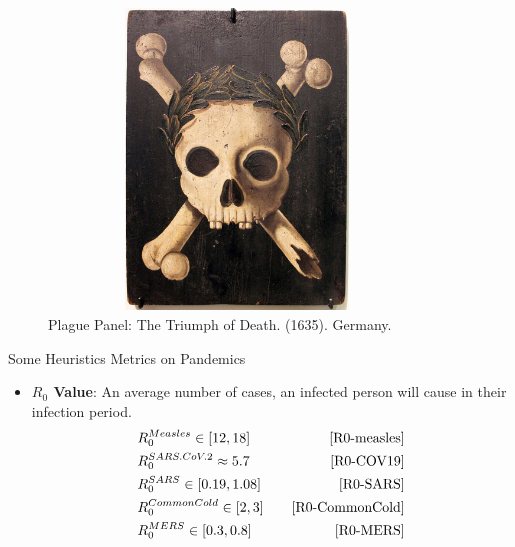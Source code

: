 \documentclass{beamer}
\begin{document}
	\begin{frame}
		\begin{figure}
			\includegraphics[width = 100mm, height = 80mm]{images/german-plague-panel.jpg}
			\caption{Plague Panel: The Triumph of Death. (1635). Germany.}
		\end{figure}
	\end{frame}

    \begin{frame}{Some Heuristics Metrics on Pandemics}
    	\begin{itemize}
    		\item \textbf{$R_0$ Value}: An average number of cases, an infected person will cause in their infection period.\\
    			\begin{align*}
		    		&R^{Measles}_{0} \in [12,18] \quad&\cite{R0-measles}\\
		    		&R^{SARS. CoV. 2}_{0} \approx 5.7\quad&\cite{R0-COV19}\\
		    		&R^{SARS}_{0} \in  [0.19,1.08]\quad&\cite{R0-SARS}\\
		    		&R^{Common Cold}_{0} \in [2,3]\quad&\cite{R0-CommonCold}\\
		    		&R^{MERS}_{0} \in [0.3, 0.8]\quad&\cite{R0-MERS}
    			\end{align*}
    	\end{itemize}  
    \end{frame}
	
    \begin{frame}
    	
		    	
    \end{frame}
\end{document}
